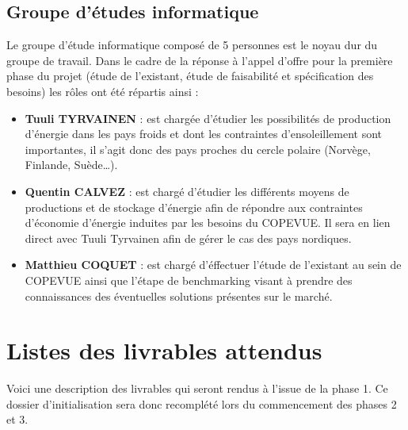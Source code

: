     \subsection{Groupe d'études informatique}
Le groupe d'étude informatique composé de 5 personnes est le noyau dur du groupe de travail. Dans le cadre de la réponse à l'appel d'offre pour la première phase du projet (étude de l'existant, étude de faisabilité et spécification des besoins) les rôles ont été répartis ainsi  :
\begin{itemize}
\item \textbf{Tuuli TYRVAINEN} : est chargée d'étudier les possibilités de production d'énergie dans les pays froids et dont les contraintes d'ensoleillement sont importantes, il s'agit donc des pays proches du cercle polaire (Norvège, Finlande, Suède…).
\item \textbf{Quentin CALVEZ} : est chargé d'étudier les différents moyens de productions et de stockage d'énergie afin de répondre aux contraintes d'économie d'énergie induites par les besoins du COPEVUE. Il sera en lien direct avec Tuuli Tyrvainen afin de gérer le cas des pays nordiques.
\item \textbf{Matthieu COQUET} : est chargé d'éffectuer l'étude de l'existant au sein de COPEVUE ainsi que l'étape de benchmarking visant à prendre des connaissances des éventuelles solutions présentes sur le marché.
\end{itemize}

    
    \section{Listes des livrables attendus}
Voici une description des livrables qui seront rendus à l'issue de la phase 1. Ce dossier d'initialisation sera donc recomplété lors du commencement des phases 2 et 3.

